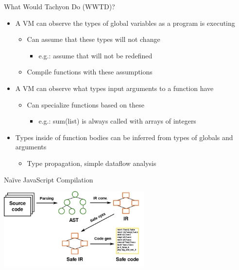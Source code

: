 \begin{frame}{What Would Tachyon Do (WWTD)?}
\begin{itemize}
    \item A VM can observe the types of global variables as a program is executing
    \begin{itemize}
        \item Can assume that these types will not change
        \begin{itemize}
            \item e.g.: assume that  will not be redefined
        \end{itemize}
        \item Compile functions with these assumptions
    \end{itemize}

    \item A VM can observe what types input arguments to a function have
    \begin{itemize}
        \item Can specialize functions based on these
        \begin{itemize}
            \item e.g.: sum(list) is always called with arrays of integers
        \end{itemize}
    \end{itemize}

    \item Types inside of function bodies can be inferred from types of globals and arguments
    \begin{itemize}
        \item Type propagation, simple dataflow analysis
    \end{itemize}
\end{itemize}
\end{frame}

\begin{frame}{Naïve JavaScript Compilation}
\begin{center}
\includegraphics[width=3in]{images/transforms1}
\end{center}
\end{frame}

